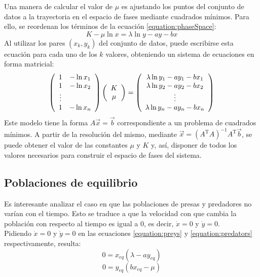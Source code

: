 \documentclass[journal, monochrome]{IEEEtran}
\begin{document}
Una manera de calcular el valor de $\mu$ es ajustando los puntos del conjunto de datos a la trayectoria en el espacio de fases mediante cuadrados mínimos. Para ello, 
se reordenan los términos de la ecuación \ref{equation:phaseSpace}:
\begin{equation}
K - \mu \ln x = \lambda \ln y - a y - b x
\end{equation}
Al utilizar los pares $(x_k, y_k)$ del conjunto de datos, puede escribirse esta ecuación para cada uno de los $k$ valores, obteniendo un sistema de ecuaciones en forma matricial:
\begin{equation}
\left(
\begin{array}{c c}
1 & -\ln x_1 \\
1 & -\ln x_2 \\
\vdots \\
1 & - \ln x_n \\
\end{array}
\right)
\left(
\begin{array}{c}
K \\
\mu
\end{array}
\right)
=
\left(
\begin{array}{c}
\lambda \ln y_1 - a y_1 - b x_1 \\
\lambda \ln y_2 - a y_2 - b x_2 \\
\vdots \\
\lambda \ln y_n - a y_n - b x_n \\
\end{array}
\right)
\label{equation:lsSystemSolution}
\end{equation}
Este modelo tiene la forma $A \vec{x} = \vec{b}$ correspondiente a un problema de cuadrados mínimos. A partir de la resolución del mismo, 
mediante $\vec{x} = (A^\text{T} A)^{-1} A^\text{T} \vec{b}$,
se puede obtener el valor de las constantes $\mu$ y $K$ y, así, disponer de todos los valores necesarios para construir el espacio de fases del sistema.

\subsection{Poblaciones de equilibrio}

Es interesante analizar el caso en que las poblaciones de presas y predadores no varían con el tiempo. Esto se traduce a 
que la velocidad con que cambia la población con respecto al tiempo es igual a 0, es decir, $\dot{x} = 0$ y $\dot{y} = 0$.\\

Pidiendo $\dot{x} = 0$ y $\dot{y} = 0$ en las ecuaciones \ref{equation:preys} y \ref{equation:predators} respectivamente, resulta: 
\begin{equation}
0 = x_{eq}(\lambda - ay_{eq})
\label{equation:y_eq1}
\end{equation}
\begin{equation}
0 = y_{eq}(bx_{eq} - \mu)
\label{equation:x_eq1}
\end{equation}
\end{document}
